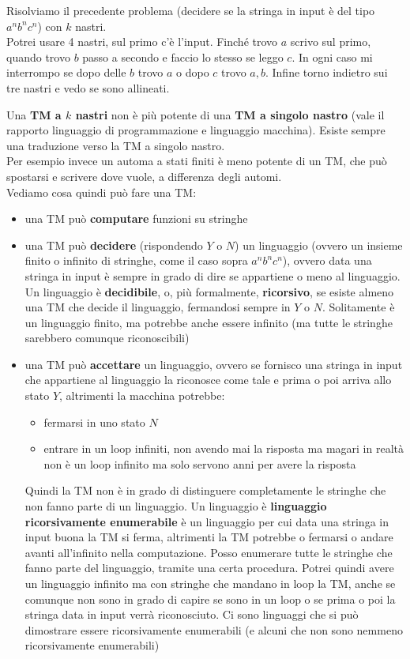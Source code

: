 \documentclass[a4paper,12pt, oneside]{book}
\begin{document}
\begin{esempio}
  Risolviamo il precedente problema (decidere se la stringa in input è del tipo
  $a^nb^nc^n$) con $k$ nastri.\\
  Potrei usare 4 nastri, sul primo c'è l'input. Finché trovo $a$ scrivo sul
  primo, quando trovo $b$ passo a secondo e faccio lo stesso se leggo $c$. In
  ogni caso mi interrompo se dopo delle $b$ trovo $a$ o dopo $c$ trovo
  $a,b$. Infine torno indietro sui tre nastri e vedo se sono allineati.
\end{esempio}
Una \textbf{TM a $k$ nastri} non è più potente di una \textbf{TM a singolo
  nastro} (vale il rapporto linguaggio di programmazione e linguaggio
macchina). Esiste sempre una traduzione verso la TM a singolo nastro.\\
Per esempio invece un automa a stati finiti è meno potente di un TM, che può
spostarsi e scrivere dove vuole, a differenza degli automi.\\
Vediamo cosa quindi può fare una TM:
\begin{itemize}
  \item una TM può \textbf{computare} funzioni su stringhe
  \item una TM può \textbf{decidere} (rispondendo $Y$ o $N$) un linguaggio
  (ovvero un insieme finito o infinito di stringhe, come il caso sopra
  $a^nb^nc^n$), ovvero data una stringa in input è sempre in grado di dire se
  appartiene o meno al linguaggio. Un linguaggio è \textbf{decidibile}, o, più
  formalmente, \textbf{ricorsivo}, se esiste
  almeno una TM che decide il linguaggio, fermandosi sempre in $Y$ o
  $N$. Solitamente è un linguaggio finito, ma potrebbe anche essere infinito (ma
  tutte le stringhe sarebbero comunque riconoscibili)
  \item una TM può \textbf{accettare} un linguaggio, ovvero se fornisco una
  stringa in input che appartiene al linguaggio la riconosce come tale e prima o
  poi arriva allo stato $Y$, altrimenti la macchina potrebbe:
  \begin{itemize}
    \item fermarsi in uno stato $N$
    \item entrare in un loop infiniti, non avendo mai la risposta ma magari in
    realtà non è un loop infinito ma solo servono anni per avere la risposta
  \end{itemize}
  Quindi la TM non è in grado di distinguere completamente le stringhe che non
  fanno parte di un linguaggio. Un linguaggio è \textbf{linguaggio
    ricorsivamente enumerabile} è un linguaggio per cui data una stringa in
  input buona la TM si ferma, altrimenti la TM potrebbe o fermarsi o andare
  avanti all'infinito nella computazione. Posso enumerare tutte le stringhe che
  fanno parte del linguaggio, tramite una certa procedura. Potrei quindi avere
  un linguaggio infinito ma con 
  stringhe che mandano in loop la TM, anche se comunque non sono in grado di
  capire se sono in un loop o se prima o poi la stringa data in input verrà
  riconosciuto. Ci sono linguaggi che si può dimostrare 
  essere ricorsivamente enumerabili (e alcuni che non sono nemmeno
  ricorsivamente enumerabili)
\end{itemize}
\end{document}
